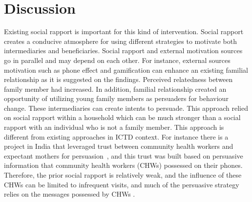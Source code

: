 \section{Discussion}
Existing social rapport is important for this kind of intervention. Social rapport creates a conducive atmosphere for using different strategies to motivate both intermediaries and beneficiaries. Social rapport and external motivation sources go in parallel and may depend on each other. For instance,  external sources motivation such as phone effect and gamification can enhance an existing familial relationship as it is suggested on the findings. Perceived relatedness between family member had increased. In addition, familial relationship created an opportunity of utilizing young family members as persuaders for behaviour change. These intermediaries can create intents to persuade. This approach relied on social rapport within a household which can be much stronger than a social rapport with an individual who is not a family member. This approach is different from existing approaches in ICTD context.  For instance there is a project in India that leveraged trust between community health workers and expectant mothers for  persuasion~\citep{ramachandran2010mobile,ramachandran2010research}, and this trust was built based on persuasive information that community health workers (CHWs) possessed on their phones. Therefore, the prior social rapport is relatively weak, and the  influence of these CHWs can be limited to infrequent visits, and much of the persuasive strategy relies on the messages possessed by CHWs \citep{katule2016leveraging}.  

